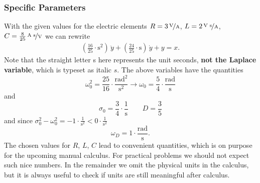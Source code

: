 \subsubsection{Specific Parameters}
With the given values for the electric elements
$R = 3\,\nicefrac{\text{V}}{\text{A}}$,
$L=2\,\nicefrac{\text{V s}}{\text{A}}$,
$C=\frac{8}{25}\,\nicefrac{\text{A s}}{\text{V}}$
we can rewrite 
\begin{align}
\boxed{
(\frac{16}{25} \cdot \text{s}^2) \, \ddot{y} + (\frac{24}{25} \cdot \text{s})
\, \dot{y} + y = x.
}
\end{align}
Note that the straight letter s here represents the unit seconds, \textbf{not the Laplace
variable}, which is typeset as italic $s$.
%
The above variables have the quantities
\begin{equation}
\omega_0^2 = \frac{25}{16} \cdot \frac{\text{rad}^2}{\text{s}^2}
\rightarrow \omega_0 = \frac{5}{4} \cdot \frac{\text{rad}}{\text{s}}
\end{equation}
and
\begin{equation}
\sigma_0 = \frac{3}{4}\cdot \frac{\text{1}}{\text{s}}
\qquad D = \frac{3}{5}
\end{equation}
and since $\sigma_0^2 - \omega_0^2 = -1 \cdot \frac{1}{\text{s}^2}< 0\cdot \frac{1}{\text{s}^2}$
\begin{equation}
\omega_D = 1 \cdot \frac{\text{rad}}{\text{s}}.
\end{equation}
%
The chosen values for $R$, $L$, $C$ lead to convenient quantities, which is on
purpose for the upcoming manual calculus. For practical problems we should not
expect such nice numbers.
%
In the remainder we omit the physical units in the calculus, but it is always
useful to check if units are still meaningful after calculus.



